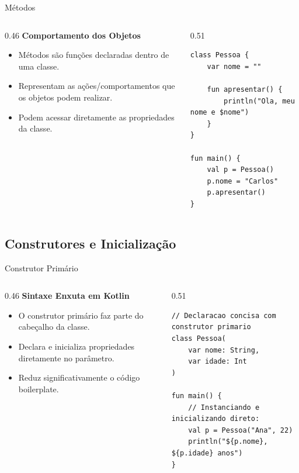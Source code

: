 \documentclass[aspectratio=169]{beamer}
\begin{document}
\begin{frame}[fragile]{Métodos}
  \begin{columns}[T]
    \begin{column}{0.46\textwidth}
      \textbf{Comportamento dos Objetos}
      \vspace{0.3em}
      \begin{itemize}\small
        \item Métodos são funções declaradas dentro de uma classe.
        \item Representam as ações/comportamentos que os objetos podem realizar.
        \item Podem acessar diretamente as propriedades da classe.
      \end{itemize}
    \end{column}
    \begin{column}{0.51\textwidth}
\begin{lstlisting}[style=KotlinStyle]
class Pessoa {
    var nome = ""

    fun apresentar() {
        println("Ola, meu nome e $nome")
    }
}

fun main() {
    val p = Pessoa()
    p.nome = "Carlos"
    p.apresentar()
}
\end{lstlisting}
    \end{column}
  \end{columns}
\end{frame}

\subsection{Construtores e Inicialização}

\begin{frame}[fragile]{Construtor Primário}
  \begin{columns}[T]
    \begin{column}{0.46\textwidth}
      \textbf{Sintaxe Enxuta em Kotlin}
      \vspace{0.3em}
      \begin{itemize}\small
        \item O construtor primário faz parte do cabeçalho da classe.
        \item Declara e inicializa propriedades diretamente no parâmetro.
        \item Reduz significativamente o código boilerplate.
      \end{itemize}
    \end{column}
    \begin{column}{0.51\textwidth}
\begin{lstlisting}[style=KotlinStyle]
// Declaracao concisa com construtor primario
class Pessoa(
    var nome: String,
    var idade: Int
)

fun main() {
    // Instanciando e inicializando direto:
    val p = Pessoa("Ana", 22)
    println("${p.nome}, ${p.idade} anos")
}
\end{lstlisting}
    \end{column}
  \end{columns}
\end{frame}
\end{document}

